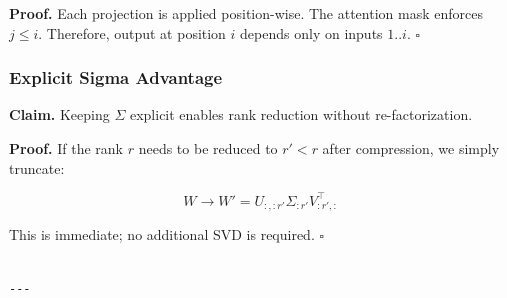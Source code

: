 \textbf{Proof.} Each projection is applied position-wise. The attention mask 
enforces $j \leq i$. Therefore, output at position $i$ depends only on 
inputs $1..i$. $\square$

\subsubsection{Explicit Sigma Advantage}

\textbf{Claim.} Keeping $\Sigma$ explicit enables rank reduction without 
re-factorization.

\textbf{Proof.} If the rank $r$ needs to be reduced to $r' < r$ after 
compression, we simply truncate:

\begin{equation}
W \to W' = U_{:, :r'} \Sigma_{:r'} V_{:r', :}^\top
\end{equation}

This is immediate; no additional SVD is required. $\square$
\begin{lstlisting}

---
\end{lstlisting}